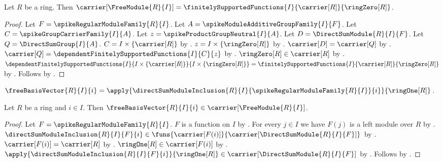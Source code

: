 \begin{theorem}\label{spike_free_module_carrier}
    Let $R$ be a ring.
    Then
        $\carrier[\FreeModule{R}{I}]
            =\finitelySupportedFunctions
                {I}{\carrier[R]}{\ringZero[R]}$.
\end{theorem}
\begin{proof}
    Let $F=\spikeRegularModuleFamily{R}{I}$.
    Let $A=\spikeModuleAdditiveGroupFamily{I}{F}$.
    Let $C=\spikeGroupCarrierFamily{I}{A}$.
    Let $z=\spikeProductGroupNeutral{I}{A}$.
    Let $D=\DirectSumModule{R}{I}{F}$.
    Let $Q=\DirectSumGroup{I}{A}$.
    $C=I\times\{\carrier[R]\}$ by
        .
    $z=I\times\{\ringZero[R]\}$ by
        .
    $\carrier[D]=\carrier[Q]$ by
        .
    $\carrier[Q]=\dependentFinitelySupportedFunctions{I}{C}{z}$ by
        .
    $\ringZero[R]\in\carrier[R]$ by .
    $\dependentFinitelySupportedFunctions
        {I}{I\times\{\carrier[R]\}}{I\times\{\ringZero[R]\}}
        =\finitelySupportedFunctions
            {I}{\carrier[R]}{\ringZero[R]}$ by
        .
    Follows by .
\end{proof}

\begin{definition}\label{spike_free_basis_vector}
    $\freeBasisVector{R}{I}{i}
        =\apply{\directSumModuleInclusion
            {R}{I}{\spikeRegularModuleFamily{R}{I}}{i}}{
                \ringOne[R]}$.
\end{definition}

\begin{proposition}\label{spike_free_basis_vector_type}
    Let $R$ be a ring and $i\in I$.
    Then $\freeBasisVector{R}{I}{i}\in\carrier[\FreeModule{R}{I}]$.
\end{proposition}
\begin{proof}
    Let $F=\spikeRegularModuleFamily{R}{I}$.
    $F$ is a function on $I$ by
        .
    For every $j\in I$ we have $F(j)$ is a left module over $R$ by
        .
    $\directSumModuleInclusion{R}{I}{F}{i}\in
        \funs{\carrier[F(i)]}{\carrier[\DirectSumModule{R}{I}{F}]}$ by
        .
    $\carrier[F(i)]=\carrier[R]$ by
        .
    $\ringOne[R]\in\carrier[F(i)]$ by .
    $\apply{\directSumModuleInclusion{R}{I}{F}{i}}{\ringOne[R]}
        \in\carrier[\DirectSumModule{R}{I}{F}]$ by
        .
    Follows by .
\end{proof}

